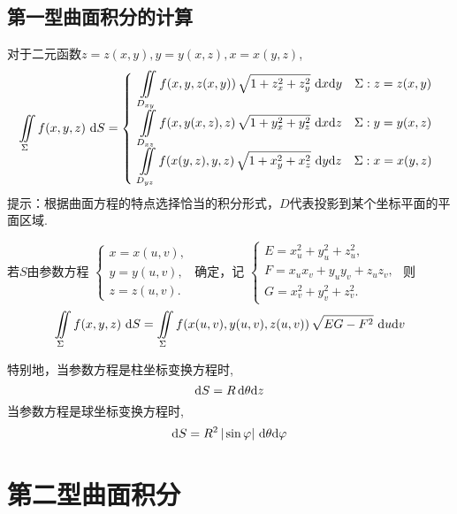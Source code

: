 \subsection{第一型曲面积分的计算}
\ttheorem[二元函数下第一型曲面积分的计算]
对于二元函数$z=z(x,y),y=y(x,z),x=x(y,z)$,
\renewcommand\arraystretch{1.5}
\begin{equation}
\iint\limits_{\Sigma}f(x,y,z)\,\,{\rm{d}} S 
=
\left\lbrace 
\begin{array}{c}
\displaystyle \iint\limits_{D_{xy}}f(x,y,z(x,y))\,\sqrt{1+z_x^2+z_y^2}\,\,{\rm{d}} x{\rm{d}} y\quad \Sigma :z=z(x,y) \\
\displaystyle  \iint\limits_{D_{xz}}f(x,y(x,z),z)\,\sqrt{1+y_x^2+y_z^2}\,\,{\rm{d}} x{\rm{d}} z\quad \Sigma :y=y(x,z) \\
\displaystyle  \iint\limits_{D_{yz}}f(x(y,z),y,z)\,\sqrt{1+x_y^2+x_z^2}\,\,{\rm{d}} y{\rm{d}} z\quad \Sigma :x=x(y,z)
\end{array}
\right.
\end{equation}
\renewcommand\arraystretch{1}
提示：根据曲面方程的特点选择恰当的积分形式，$D$代表投影到某个坐标平面的平面区域.

\theorem[参数方程下第一型曲面积分的计算]
若$S$由参数方程
$
\begin{cases}
x = x(u,v),\\
y = y(u,v),\\
z= z(u,v).
\end{cases}
$
确定，记
$
\begin{cases}
E = x_u^2 + y_u^2 +z_u^2,\\
F = x_ux_v + y_uy_v + z_uz_v,\\
G = x_v^2 + y_v^2 +z_v^2.
\end{cases}
$
则
\begin{equation}
\iint\limits_{\Sigma}f(x,y,z)\,\,{\rm{d}} S =\iint\limits_{\Sigma}f(x(u,v),y(u,v),z(u,v))\,\sqrt{EG-F^2}\,\,{\rm{d}} u {\rm{d}} v
\end{equation}
\par 特别地，当参数方程是柱坐标变换方程时,
\begin{equation}
{\rm{d}} S = R \,{\rm{d}} \theta {\rm{d}} z
\end{equation}
当参数方程是球坐标变换方程时,
\begin{equation}
{\rm{d}} S = R^2\,|\sin \varphi| \,\,{\rm{d}} \theta {\rm{d}} \varphi
\end{equation}

\section{第二型曲面积分}
